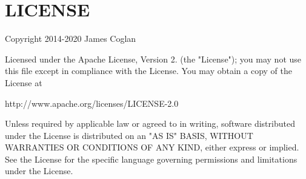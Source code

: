 \chapter{LICENSE }
\hypertarget{md__c_1_2_users_2saket_2_one_drive_2_desktop_2e_pathshala_2epathshala-_web_2node__modules_2websocket-extensions_2_l_i_c_e_n_s_e}{}\label{md__c_1_2_users_2saket_2_one_drive_2_desktop_2e_pathshala_2epathshala-_web_2node__modules_2websocket-extensions_2_l_i_c_e_n_s_e}
Copyright 2014-\/2020 James Coglan

Licensed under the Apache License, Version 2. (the "{}\+License"{}); you may not use this file except in compliance with the License. You may obtain a copy of the License at \begin{DoxyVerb}http://www.apache.org/licenses/LICENSE-2.0
\end{DoxyVerb}


Unless required by applicable law or agreed to in writing, software distributed under the License is distributed on an "{}\+AS IS"{} BASIS, WITHOUT WARRANTIES OR CONDITIONS OF ANY KIND, either express or implied. See the License for the specific language governing permissions and limitations under the License. 